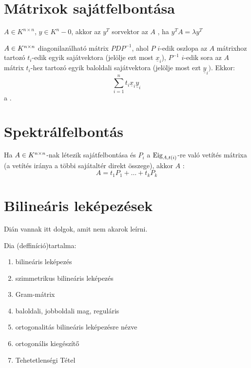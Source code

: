 \section{Mátrixok sajátfelbontása}
\begin{ff}
	$A\in K^{n\times n}$, $y\in K^n-{0}$, akkor az $y^T$ sorvektor az $A$
	, ha $y^TA=\lambda y^T$ 
\end{ff}
\begin{ff}
	$A\in K^{n\times n}$ diagonilazálható mátrix  $PDP^{-1}$, ahol $P$
	$i$-edik oszlopa az $A$ mátrixhoz tartozó $t_i$-edik egyik sajátvektora
	(jelölje ezt most $\underline{x}_i$), $P^{-1}$ $i$-edik sora az $A$ mátrix
	$t_i$-hez tartozó egyik baloldali sajátvektora (jelölje most ezt
	$\underline{y}_i)$. Ekkor:
	\begin{equation*}
		\sum_{i=1}^nt_i\underline{x}_i\underline{y}_i
	\end{equation*}
	a .
\end{ff}

\section{Spektrálfelbontás}
\begin{ff}
	Ha $A\in K^{n\times n}$-nak létezik sajátfelbontása és $P_i$ a $\operatorname{Eig}_{A,t(i)}$-re való
	vetítés mátrixa (a vetítés iránya a többi sajátaltér direkt összege),
	akkor $A$ :
	\begin{equation*}
		A=t_1P_1+\ldots+t_kP_k
	\end{equation*}
\end{ff}

\section{Bilineáris leképezések}
Dián vannak itt dolgok, amit nem akarok leírni.

Dia (deffiníció)tartalma:
\begin{enumerate}
	\item bilineáris leképezés
	\item szimmetrikus bilineáris leképezés
	\item Gram-mátrix
	\item baloldali, jobboldali mag, reguláris
	\item ortogonalitás bilineáris leképezésre nézve
	\item ortogonális kiegészítő
	\item Tehetetlenségi Tétel
\end{enumerate}

